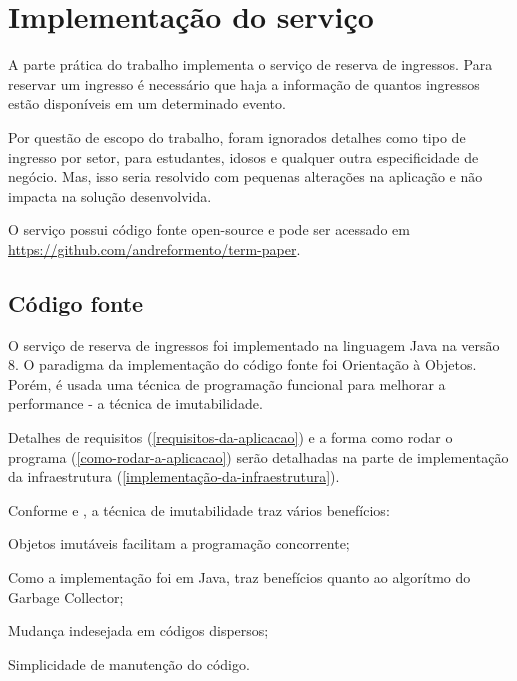 \chapter{Implementação do serviço}\label{implementacao-do-servico}


A parte prática do trabalho implementa o serviço de reserva de ingressos.
Para reservar um ingresso é necessário que haja a informação de quantos ingressos
estão disponíveis em um determinado evento. 


Por questão de escopo do trabalho,
foram ignorados detalhes como
tipo de ingresso por setor, para estudantes, idosos e qualquer outra especificidade
de negócio. Mas, isso seria resolvido com pequenas alterações na aplicação
e não impacta na solução desenvolvida.

O serviço possui código fonte open-source e pode ser acessado em
\url{https://github.com/andreformento/term-paper}.

\section{Código fonte}

O serviço de reserva de ingressos foi implementado na linguagem Java na versão 8. O paradigma
da implementação do código fonte foi Orientação à Objetos. Porém, é usada uma técnica de 
programação funcional para melhorar a performance - a técnica de imutabilidade.

Detalhes de requisitos (\autoref{requisitos-da-aplicacao}) e a
forma como rodar o programa (\autoref{como-rodar-a-aplicacao}) serão detalhadas
na parte de implementação da infraestrutura (\autoref{implementação-da-infraestrutura}).

Conforme
\cite{does-immutability-really-mean-thread-safety} e \cite{java-doc-immutable-objects},
a técnica de imutabilidade traz vários benefícios:

\begin{alineas}

  \item Objetos imutáveis facilitam a programação concorrente;

  \item Como a implementação foi em Java, traz benefícios quanto ao algorítmo do
        Garbage Collector;

  \item Mudança indesejada em códigos dispersos;

  \item Simplicidade de manutenção do código.

\end{alineas}

